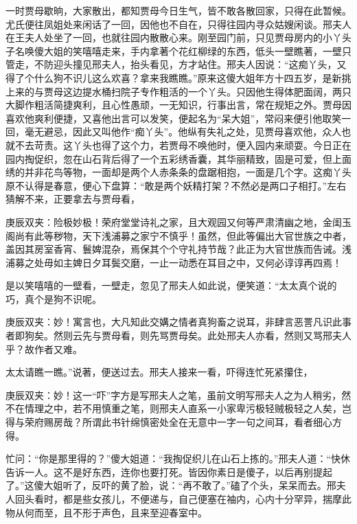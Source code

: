 \begin{parag}
    一时贾母歇晌，大家散出，都知贾母今日生气，皆不敢各散回家，只得在此暂候。尤氏便往凤姐处来闲话了一回，因他也不自在，只得往园内寻众姑嫂闲谈。邢夫人在王夫人处坐了一回，也就往园内散散心来。刚至园门前，只见贾母房内的小丫头子名唤傻大姐的笑嘻嘻走来，手内拿著个花红柳绿的东西，低头一壁瞧著，一壁只管走，不防迎头撞见邢夫人，抬头看见，方才站住。邢夫人因说：“这痴丫头，又得了个什么狗不识儿这么欢喜？拿来我瞧瞧。”原来这傻大姐年方十四五岁，是新挑上来的与贾母这边提水桶扫院子专作粗活的一个丫头。只因他生得体肥面阔，两只大脚作粗活简捷爽利，且心性愚顽，一无知识，行事出言，常在规矩之外。贾母因喜欢他爽利便捷，又喜他出言可以发笑，便起名为“呆大姐”，常闷来便引他取笑一回，毫无避忌，因此又叫他作“痴丫头”。他纵有失礼之处，见贾母喜欢他，众人也就不去苛责。这丫头也得了这个力，若贾母不唤他时，便入园内来顽耍。今日正在园内掏促织，忽在山石背后得了一个五彩绣香囊，其华丽精致，固是可爱，但上面绣的并非花鸟等物，一面却是两个人赤条条的盘踞相抱，一面是几个字。这痴丫头原不认得是春意，便心下盘算：“敢是两个妖精打架？不然必是两口子相打。”左右猜解不来，正要拿去与贾母看，\begin{note}庚辰双夹：险极妙极！荣府堂堂诗礼之家，且大观园又何等严肃清幽之地，金闺玉阁尚有此等秽物，天下浅浦募之家宁不慎乎！虽然，但此等偏出大官世族之中者，盖因其房室香宵、鬟婢混杂，焉保其个个守礼持节哉？此正为大官世族而告诫。浅浦募之处毋如主婢日夕耳鬓交磨，一止一动悉在耳目之中，又何必谆谆再四焉！\end{note}是以笑嘻嘻的一壁看，一壁走，忽见了邢夫人如此说，便笑道：“太太真个说的巧，真个是狗不识呢。\begin{note}庚辰双夹：妙！寓言也，大凡知此交媾之情者真狗畜之说耳，非肆言恶詈凡识此事者即狗矣。然则云先与贾母看，则先骂贾母矣。此处邢夫人亦看，然则又骂邢夫人乎？故作者又难。\end{note}太太请瞧一瞧。”说著，便送过去。邢夫人接来一看，吓得连忙死紧攥住，\begin{note}庚辰双夹：妙！这一“吓”字方是写邢夫人之笔，虽前文明写邢夫人之为人稍劣，然不在情理之中，若不用慎重之笔，则邢夫人直系一小家卑污极轻贼极轻之人矣，岂得与荣府赐房哉？所谓此书针绵慎密处全在无意中一字一句之间耳，看者细心方得。\end{note}忙问：“你是那里得的？”傻大姐道：“我掏促织儿在山石上拣的。”邢夫人道：“快休告诉一人。这不是好东西，连你也要打死。皆因你素日是傻子，以后再别提起了。”这傻大姐听了，反吓的黄了脸，说：“再不敢了。”磕了个头，呆呆而去。邢夫人回头看时，都是些女孩儿，不便递与，自己便塞在袖内，心内十分罕异，揣摩此物从何而至，且不形于声色，且来至迎春室中。
\end{parag}


